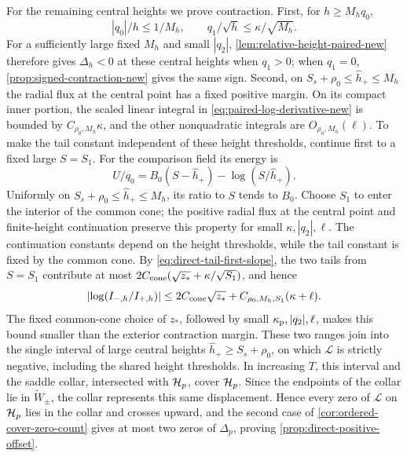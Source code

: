 For the remaining central heights we prove contraction. First, for
\(h\ge M_hq_0\),
\[
 |q_0|/h\le1/M_h,\qquad q_1/\sqrt h\le\kappa/\sqrt{M_h}.
\]
For a sufficiently large fixed \(M_h\) and small \(|q_2|\),
\cref{lem:relative-height-paired-new} therefore gives
\(\Delta_h<0\) at these central heights when \(q_1>0\); when
\(q_1=0\), \cref{prop:signed-contraction-new} gives the same sign.
Second, on \(S_s+\rho_0\le\widehat h_+\le M_h\) the radial flux at
the central point has a fixed positive margin. On its compact inner
portion, the scaled linear integral in \eqref{eq:paired-log-derivative-new}
is bounded by \(C_{\rho_0,M_h}\kappa\), and the other nonquadratic integrals
are \(O_{\rho_0,M_h}(\ell)\). To make the tail constant
independent of these height thresholds, continue first to a fixed
large \(S=S_1\). For the comparison field its energy is
\[
 U/q_0=B_0(S-\widehat h_+)-\log(S/\widehat h_+).
\]
Uniformly on \(S_s+\rho_0\le\widehat h_+\le M_h\), its ratio to
\(S\) tends to \(B_0\). Choose \(S_1\) to enter the interior
of the common cone; the positive radial flux at the central point and
finite-height continuation preserve this property for small
\(\kappa,|q_2|,\ell\). The continuation constants depend on the height
thresholds, while the tail constant is fixed by the common cone. By
\eqref{eq:direct-tail-first-slope}, the two tails from \(S=S_1\)
contribute at most \(2C_{\rm cone}(\sqrt{z_*}+\kappa/\sqrt{S_1})\), and
hence
\[
 \left|\log(I_{-,h}/I_{+,h})\right|
 \le 2C_{\rm cone}\sqrt{z_*}
       +C_{\rho_0,M_h,S_1}(\kappa+\ell).
\]
The fixed common-cone choice of \(z_*\), followed by small
\(\kappa_{\rm p},|q_2|,\ell\),
makes this bound smaller than the exterior contraction margin.
These two ranges join into the single interval of large central
heights \(\widehat h_+\ge S_s+\rho_0\), on which \(\mathcal L\) is
strictly negative, including the shared height thresholds.
In increasing \(T\), this interval and the saddle collar, intersected
with \(\mathcal H_p\), cover \(\mathcal H_p\). Since the endpoints of the collar lie in
\(\widetilde W_\pm\), the collar represents this same displacement.
Hence every zero of \(\mathcal L\) on \(\mathcal H_p\) lies in the collar and
crosses upward, and the second case of
\cref{cor:ordered-cover-zero-count} gives at most two zeros of
\(\Delta_p\), proving \cref{prop:direct-positive-offset}.
